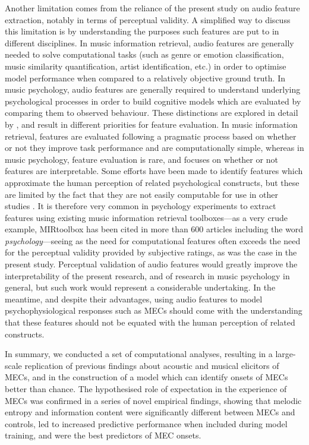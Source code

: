 Another limitation comes from the reliance of the present study on audio feature extraction, notably in terms of perceptual validity. A simplified way to discuss this limitation is by understanding the purposes such features are put to in different disciplines. In music information retrieval, audio features are generally needed to solve computational tasks (such as genre or emotion classification, music similarity quantification, artist identification, etc.) in order to optimise model performance when compared to a relatively objective ground truth. In music psychology, audio features are generally required to understand underlying psychological processes in order to build cognitive models which are evaluated by comparing them to observed behaviour. These distinctions are explored in detail by \textcite{aucouturier2012,aucouturier2013}, and result in different priorities for feature evaluation. In music information retrieval, features are evaluated following a pragmatic process based on whether or not they improve task performance and are computationally simple, whereas in music psychology, feature evaluation is rare, and focuses on whether or not features are interpretable. Some efforts have been made to identify features which approximate the human perception of related psychological constructs, but these are limited by the fact that they are not easily computable for use in other studies \parencite[e.g.,][]{aljanaki2018,friberg2014}. It is therefore very common in psychology experiments to extract features using existing music information retrieval toolboxes---as a very crude example, MIRtoolbox \parencite{lartillot2008} has been cited in more than 600 articles including the word \emph{psychology}---seeing as the need for computational features often exceeds the need for the perceptual validity provided by subjective ratings, as was the case in the present study. Perceptual validation of audio features would greatly improve the interpretability of the present research, and of research in music psychology in general, but such work would represent a considerable undertaking. In the meantime, and despite their advantages, using audio features to model psychophysiological responses such as MECs should come with the understanding that these features should not be equated with the human perception of related constructs.

In summary, we conducted a set of computational analyses, resulting in a large-scale replication of previous findings about acoustic and musical elicitors of MECs, and in the construction of a model which can identify onsets of MECs better than chance. The hypothesised role of expectation in the experience of MECs was confirmed in a series of novel empirical findings, showing that melodic entropy and information content were significantly different between MECs and controls, led to increased predictive performance when included during model training, and were the best predictors of MEC onsets.
